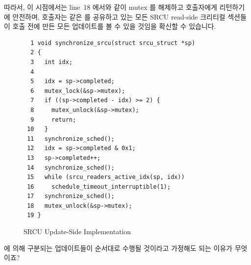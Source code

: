 따라서, 이 시점에서는 line~18 에서와 같이 mutex 를 해제하고 호출자에게
리턴하기에 안전하며, 호출자는 같은   를 공유하고
있는 모든 SRCU read-side 크리티컬 섹션들이  호출 전에
만든 모든 업데이트를 볼 수 있을 것임을 확신할 수 있습니다.

\begin{figure}[htbp]
{ \scriptsize
\begin{verbatim}
  1 void synchronize_srcu(struct srcu_struct *sp)
  2 {
  3   int idx;
  4
  5   idx = sp->completed;
  6   mutex_lock(&sp->mutex);
  7   if ((sp->completed - idx) >= 2) {
  8     mutex_unlock(&sp->mutex);
  9     return;
 10   }
 11   synchronize_sched();
 12   idx = sp->completed & 0x1;
 13   sp->completed++;
 14   synchronize_sched();
 15   while (srcu_readers_active_idx(sp, idx))
 16     schedule_timeout_interruptible(1);
 17   synchronize_sched();
 18   mutex_unlock(&sp->mutex);
 19 }
\end{verbatim}
}
\caption{SRCU Update-Side Implementation}
\label{fig:app:rcuimpl:Update-Side Implementation}
\end{figure}

\QuickQuiz{}
	 에 의해 구분되는 업데이트들이 순서대로 수행될
	것이라고 가정해도 되는 이유가 무엇이죠?
	\iffalse

